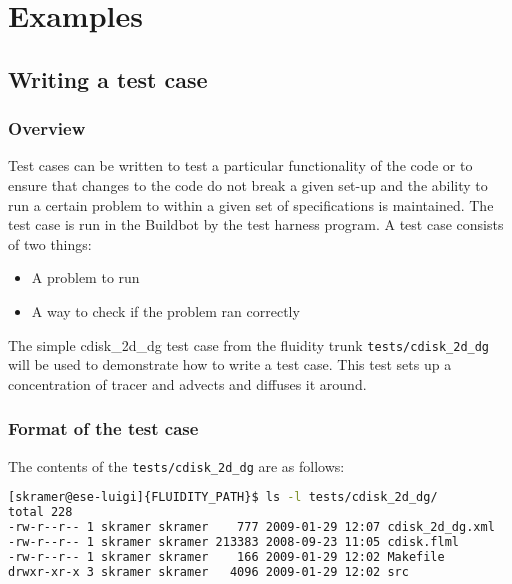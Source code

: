 \chapter{Examples}
\label{chap:examples}


\section{Writing a test case} 
\label{sect:test_case}

\subsection{Overview}

Test cases can be written to test a particular functionality of the code or to ensure that changes to the code do not break a given set-up and the ability to run a certain problem to within a given set of specifications is maintained. The test case is run in the Buildbot \citep{warner2003} by the test harness program. A test case consists of two things: 
\begin{itemize}
\item A problem to run
\item A way to check if the problem ran correctly
\end{itemize}

The simple cdisk\_2d\_dg test case from the fluidity trunk \lstinline[language=bash]+tests/cdisk_2d_dg+ will be used to demonstrate how to write a test case. This test sets up a concentration of tracer and advects and diffuses it around.

\subsection{Format of the test case}

The contents of the \lstinline[language=bash]+tests/cdisk_2d_dg+ are as follows:
\begin{example}
\begin{lstlisting}[language=bash]
[skramer@ese-luigi]{FLUIDITY_PATH}$ ls -l tests/cdisk_2d_dg/ 
total 228 
-rw-r--r-- 1 skramer skramer    777 2009-01-29 12:07 cdisk_2d_dg.xml 
-rw-r--r-- 1 skramer skramer 213383 2008-09-23 11:05 cdisk.flml
-rw-r--r-- 1 skramer skramer    166 2009-01-29 12:02 Makefile 
drwxr-xr-x 3 skramer skramer   4096 2009-01-29 12:02 src
\end{lstlisting}
\end{example}

